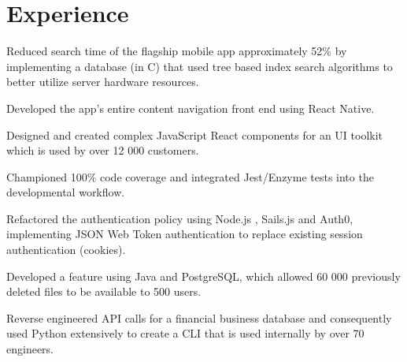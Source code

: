 \documentclass[]{anand-resume}
\begin{document}
\begin{minipage}[t]{0.69\textwidth} 


\section{Experience}

\vspace{\topsep} %
\begin{tightemize}\item Reduced search time of the flagship mobile app approximately 52\% by implementing a database (in C) that used tree based index search algorithms to better utilize server hardware resources.
\item Developed the app's entire content navigation front end using React Native.
\end{tightemize}
\sectionsep

\begin{tightemize}\item Designed and created complex JavaScript React components for an UI toolkit which is used by over 12 000 customers.
\item Championed 100\% code coverage and integrated Jest/Enzyme tests into the developmental workflow.
\end{tightemize}
\sectionsep

\begin{tightemize}\item Refactored the authentication policy using Node.js , Sails.js and Auth0, implementing JSON Web Token authentication to replace existing session authentication (cookies).

\item Developed a feature using Java and PostgreSQL, which allowed 60 000 previously deleted files to be available to 500 users.
\end{tightemize}
\sectionsep

\begin{tightemize}\item Reverse engineered API calls for a financial business database and consequently used Python extensively to create a CLI that is used internally by over 70 engineers.


\end{tightemize}
\end{minipage}
\end{document}
